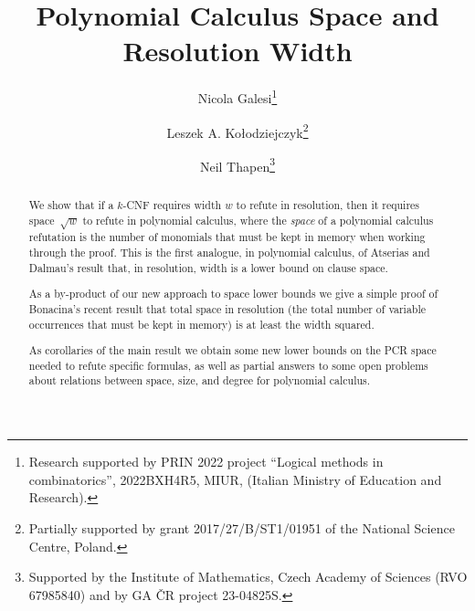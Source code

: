 \documentclass{toc}
\begin{document}
\begin{frontmatter}%

%
%
%

%
%

 \title{Polynomial Calculus Space and\\ Resolution Width}
%
%
%

%
%

%
%
%
%
%
%

%
%
%
%
%
%
%
%
%
%
%
%


%
%
%
%

%

\author[galesi]{Nicola Galesi\thanks{
%
 Research supported by PRIN 2022 project “Logical methods in combinatorics”, 2022BXH4R5, MIUR, (Italian Ministry of
Education and Research).}}
\author[kolodziejczyk]{Leszek A. Ko\l{}odziejczyk\thanks{
Partially supported by grant 2017/27/B/ST1/01951 of the National
Science Centre, Poland.}}
\author[thapen]{Neil Thapen\thanks{
%
%
%
%
Supported by the Institute of Mathematics, Czech Academy of Sciences (RVO 67985840)
and by GA \v{C}R project 23-04825S. }} %

%
%
%
%

%
%
%
%
%
%
%
%
\begin{abstract}
We show that if a $k$-CNF requires width $w$ to refute in 
resolution, then it requires space~$\sqrt w$
to refute in polynomial calculus, where the \emph{space} of a polynomial 
calculus refutation is the number of monomials that must
be kept in memory when working through the proof.
This is the first analogue, in polynomial calculus, 
of Atserias and Dalmau's result 
%
%
 that, in resolution, width is a lower bound on clause space. %

As a by-product of our new approach to space lower bounds 
we give a simple proof of Bonacina's recent result
that total space in resolution (the total number of variable
occurrences that must be kept in memory) %
%
%
is at least the width squared. %

As corollaries of the main result we obtain some new lower bounds on the PCR space needed to refute specific formulas, as well as partial answers to some open problems about relations between space, size, and degree for polynomial calculus.
\end{abstract}

%

\end{frontmatter}
\end{document}
